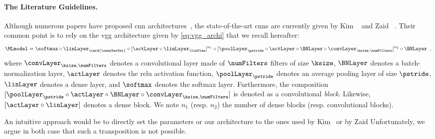 \paragraph{The Literature Guidelines.}
Although numerous papers have proposed \gls{cnn} architectures~\cite{maghrebi_breaking_2016,cagli_convolutional_2017,prouff_study_2018}, the state-of-the-art \glspl{cnn} are currently given by Kim \etal{}~\cite{kim_make_2019} and Zaid \etal{}~\cite{zaid_methodology_2019}.
Their common point is to rely on the \gls{vgg} architecture given by \autoref{eq:vgg_archi} that we recall hereafter:
\begin{equation}\label{eq:vgg_archi_esorics}
	\MLmodel = 
	\softmax \circ \linLayer_{\card{\sensVarSet}} \circ [\actLayer \circ \linLayer_\linSize]^{n_1}
	\circ [\poolLayer_\pstride \circ \actLayer \circ \BNLayer \circ \convLayer_{\ksize, \numFilters}]^{n_2} \circ \BNLayer \enspace ,
\end{equation}
where \(\convLayer_{\ksize, \numFilters}\) denotes a convolutional layer made of \(\numFilters\) filters of size \(\ksize\), \(\BNLayer\) denotes a batch-normalization layer, \(\actLayer\) denotes the \gls{relu} activation function, \(\poolLayer_{\pstride}\) denotes an average pooling layer of size \(\pstride\), \(\linLayer\) denotes a dense layer, and \(\softmax\) denotes the softmax layer.
Furthermore, the composition \([\poolLayer_{\pstride} \circ \actLayer \circ \BNLayer \circ \convLayer_{\ksize, \numFilters}]\) is denoted as a convolutional \emph{block}.
Likewise, \([\actLayer \circ \linLayer]\) denotes a dense block.
We note \(n_1\) (resp. \(n_2\)) the number of dense blocks (resp. convolutional blocks).

An intuitive approach would be to directly set the parameters or our architecture to the ones used by Kim \etal{}\ or by Zaid \etal{}
Unfortunately, we argue in both case that such a transposition is not possible.

